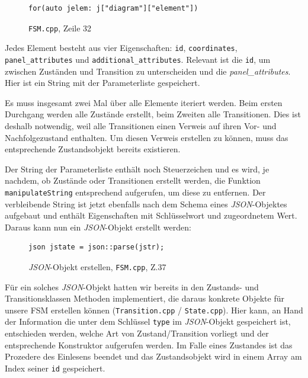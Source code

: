 \begin{figure}[thp]
\begin{lstlisting}[style=json]
for(auto jelem: j["diagram"]["element"])

\end{lstlisting}
\centering
\caption{\texttt{FSM.cpp}, Zeile 32}
\end{figure}

Jedes Element besteht aus vier Eigenschaften: \texttt{id}, \texttt{coordinates},
\texttt{panel\_attributes} und \texttt{additional\_attributes}. Relevant ist die \texttt{id}, um
zwischen Zuständen und Transition zu unterscheiden und die \textit{panel\_attributes}.
Hier ist ein String mit der Parameterliste gespeichert.

Es muss insgesamt zwei Mal über alle Elemente iteriert werden. Beim ersten
Durchgang werden alle Zustände erstellt, beim Zweiten alle Transitionen. Dies
ist deshalb notwendig, weil alle Transitionen einen Verweis auf ihren Vor- und
Nachfolgezustand enthalten. Um diesen Verweis erstellen zu können, muss das
entsprechende Zustandsobjekt bereits existieren.

Der String der Parameterliste enthält noch Steuerzeichen und es wird, je
nachdem, ob Zustände oder Transitionen erstellt werden, die Funktion
\texttt{manipulateString} entsprechend aufgerufen, um diese zu entfernen. Der
verbleibende String ist jetzt ebenfalls nach dem Schema eines \textit{JSON}-Objektes
aufgebaut und enthält Eigenschaften mit Schlüsselwort und zugeordnetem Wert.
Daraus kann nun ein \textit{JSON}-Objekt erstellt werden:

\begin{figure}[thp]
\begin{lstlisting}[style=json]
json jstate = json::parse(jstr);

\end{lstlisting}

\centering
\caption{\textit{JSON}-Objekt erstellen, \texttt{FSM.cpp}, Z.37}
\end{figure}


Für ein solches \textit{JSON}-Objekt hatten wir bereits in den Zustands- und
Transitionsklassen Methoden implementiert, die daraus konkrete Objekte für unsere
FSM erstellen können (\texttt{Transition.cpp} / \texttt{State.cpp}).
Hier kann, an Hand der Information die unter dem Schlüssel \texttt{type} im \textit{JSON}-Objekt
gespeichert ist, entschieden werden, welche Art von Zustand/Transition vorliegt
und der entsprechende Konstruktor aufgerufen werden.
Im Falle eines Zustandes ist das Prozedere des Einlesens beendet und das
Zustandsobjekt wird in einem Array am Index seiner \texttt{id} gespeichert.

